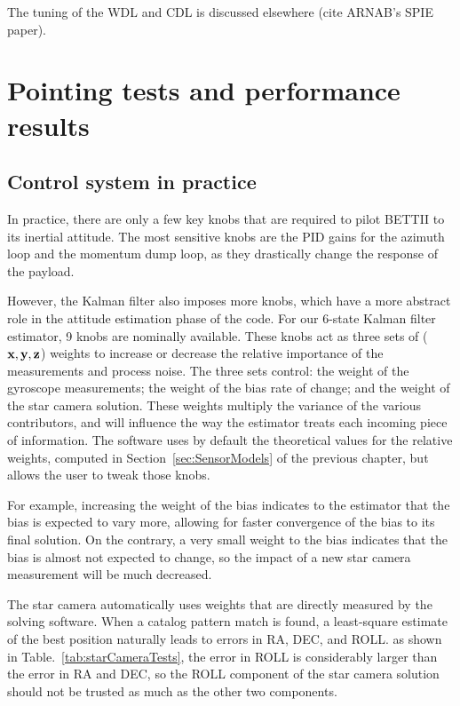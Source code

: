 The tuning of the WDL and CDL is discussed elsewhere (cite ARNAB's SPIE paper).



\section{Pointing tests and performance results}

\subsection{Control system in practice}

In practice, there are only a few key knobs that are required to pilot BETTII to its inertial attitude. The most sensitive knobs are the PID gains for the azimuth loop and the momentum dump loop, as they drastically change the response of the payload. 

However, the Kalman filter also imposes more knobs, which have a more abstract role in the attitude estimation phase of the code. For our 6-state Kalman filter estimator, 9 knobs are nominally available. These knobs act as three sets of ($\textrm{\textbf{x}}, \textrm{\textbf{y}}, \textrm{\textbf{z}}$) weights to increase or decrease the relative importance of the measurements and process noise. The three sets control: the weight of the gyroscope measurements; the weight of the bias rate of change; and the weight of the star camera solution. These weights multiply the variance of the various contributors, and will influence the way the estimator treats each incoming piece of information. The software uses by default the theoretical values for the relative weights, computed in Section~\ref{sec:SensorModels} of the previous chapter, but allows the user to tweak those knobs. 

For example, increasing the weight of the bias indicates to the estimator that the bias is expected to vary more, allowing for faster convergence of the bias to its final solution. On the contrary, a very small weight to the bias indicates that the bias is almost not expected to change, so the impact of a new star camera measurement will be much decreased. 

The star camera automatically uses weights that are directly measured by the solving software. When a catalog pattern match is found, a least-square estimate of the best position naturally leads to errors in RA, DEC, and ROLL. as shown in Table.~\ref{tab:starCameraTests}, the error in ROLL is considerably larger than the error in RA and DEC, so the ROLL component of the star camera solution should not be trusted as much as the other two components. 

